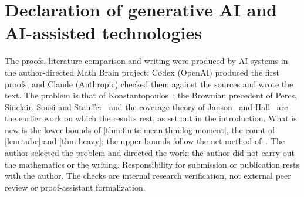 \documentclass[11pt,a4paper]{article}
\numberwithin{equation}{section}
\theoremstyle{definition}
\theoremstyle{remark}
\begin{document}
\section*{Declaration of generative AI and AI-assisted technologies}
The proofs, literature comparison and writing were produced by AI systems in the author-directed Math Brain project: Codex (OpenAI) produced the first proofs, and Claude (Anthropic) checked them against the sources and wrote the text. The problem is that of Konstantopoulos~\cite{Kon14}; the Brownian precedent of Peres, Sinclair, Sousi and Stauffer~\cite{PSSS13} and the coverage theory of Janson~\cite{Jan86} and Hall~\cite{Hal88} are the earlier work on which the results rest, as set out in the introduction. What is new is the lower bounds of \cref{thm:finite-mean,thm:log-moment}, the count of \cref{lem:tube} and \cref{thm:heavy}; the upper bounds follow the net method of~\cite{PSSS13}. The author selected the problem and directed the work; the author did not carry out the mathematics or the writing. Responsibility for submission or publication rests with the author. The checks are internal research verification, not external peer review or proof-assistant formalization.
\end{document}

